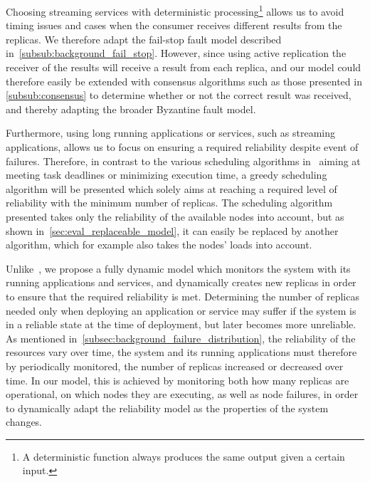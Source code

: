 \documentclass{cslthse-msc}
\begin{document}
Choosing streaming services with deterministic processing\footnote{A deterministic function always produces the same output given a certain input.} allows us to avoid timing issues and cases when the consumer receives different results from the replicas. We therefore adapt the fail-stop fault model described in~\cref{subsub:background_fail_stop}. However, since using active replication the receiver of the results will receive a result from each replica, and our model could therefore easily be extended with consensus algorithms such as those presented in \cref{subsub:consensus} to determine whether or not the correct result was received, and thereby adapting the broader Byzantine fault model. %

Furthermore, using long running applications or services, such as streaming applications, allows us to focus on ensuring a required reliability despite event of failures. Therefore, in contrast to the various scheduling algorithms in~\cite{algoOptTimeMaxRel, optTaskAllocationForMaxRel, taskAllocation, taskAllocationSwarm, algoMaxRelEndToEndConstraint, algoMinExTime, schedReplicas} aiming at meeting task deadlines or minimizing execution time, a greedy scheduling algorithm will be presented which solely aims at reaching a required level of reliability with the minimum number of replicas. The scheduling algorithm presented takes only the reliability of the available nodes into account, but as shown in~\ref{sec:eval_replaceable_model}, it can easily be replaced by another algorithm, which for example also takes the nodes' loads into account.

Unlike~\cite{designFaultTolerantSched, evalReplicationSched, taskSchedulingReplication, effTaskReplMobGrid, relGridServicePredConstraint}, we propose a fully dynamic model which monitors the system with its running applications and services, and dynamically creates new replicas in order to ensure that the required reliability is met. Determining the number of replicas needed only when deploying an application or service may suffer if the system is in a reliable state at the time of deployment, but later becomes more unreliable. As mentioned in~\cref{subsec:background_failure_distribution}, the reliability of the resources vary over time, the system and its running applications must therefore by periodically monitored, the number of replicas increased or decreased over time. In our model, this is achieved by monitoring both how many replicas are operational, on which nodes they are executing, as well as node failures, in order to dynamically adapt the reliability model as the properties of the system changes.
\end{document}
